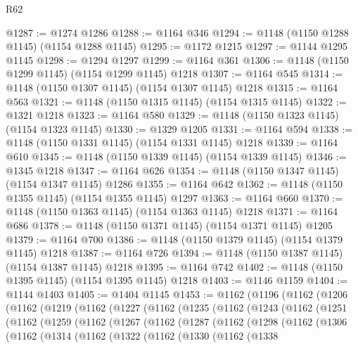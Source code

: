 \begin{lexlean}{R62}
\begin{coremodule}
@1287 := @1274 @1286
@1288 := @1164 @346
@1294 := @1148 (@1150 @1288 @1145) (@1154 @1288 @1145)
@1295 := @1172 @1215
@1297 := @1144 @1295 @1145
@1298 := @1294 @1297
@1299 := @1164 @361
@1306 := @1148 (@1150 @1299 @1145) (@1154 @1299 @1145) @1218
@1307 := @1164 @545
@1314 := @1148 (@1150 @1307 @1145) (@1154 @1307 @1145) @1218
@1315 := @1164 @563
@1321 := @1148 (@1150 @1315 @1145) (@1154 @1315 @1145)
@1322 := @1321 @1218
@1323 := @1164 @580
@1329 := @1148 (@1150 @1323 @1145) (@1154 @1323 @1145)
@1330 := @1329 @1205
@1331 := @1164 @594
@1338 := @1148 (@1150 @1331 @1145) (@1154 @1331 @1145) @1218
@1339 := @1164 @610
@1345 := @1148 (@1150 @1339 @1145) (@1154 @1339 @1145)
@1346 := @1345 @1218
@1347 := @1164 @626
@1354 := @1148 (@1150 @1347 @1145) (@1154 @1347 @1145) @1286
@1355 := @1164 @642
@1362 := @1148 (@1150 @1355 @1145) (@1154 @1355 @1145) @1297
@1363 := @1164 @660
@1370 := @1148 (@1150 @1363 @1145) (@1154 @1363 @1145) @1218
@1371 := @1164 @686
@1378 := @1148 (@1150 @1371 @1145) (@1154 @1371 @1145) @1205
@1379 := @1164 @700
@1386 := @1148 (@1150 @1379 @1145) (@1154 @1379 @1145) @1218
@1387 := @1164 @726
@1394 := @1148 (@1150 @1387 @1145) (@1154 @1387 @1145) @1218
@1395 := @1164 @742
@1402 := @1148 (@1150 @1395 @1145) (@1154 @1395 @1145) @1218
@1403 := @1146 @1159
@1404 := @1144 @1403
@1405 := @1404 @1145
@1453 := @1162
    (@1196
      (@1162
        (@1206
          (@1162
            (@1219
              (@1162
                (@1227
                  (@1162
                    (@1235
                      (@1162
                        (@1243
                          (@1162
                            (@1251
                              (@1162
                                (@1259
                                  (@1162
                                    (@1267
                                      (@1162
                                        (@1287
                                          (@1162
                                            (@1298
                                              (@1162
                                                (@1306
                                                  (@1162
                                                    (@1314
                                                      (@1162
                                                        (@1322
                                                          (@1162
                                                            (@1330
                                                              (@1162
                                                                (@1338

\end{coremodule}
\end{lexlean}
